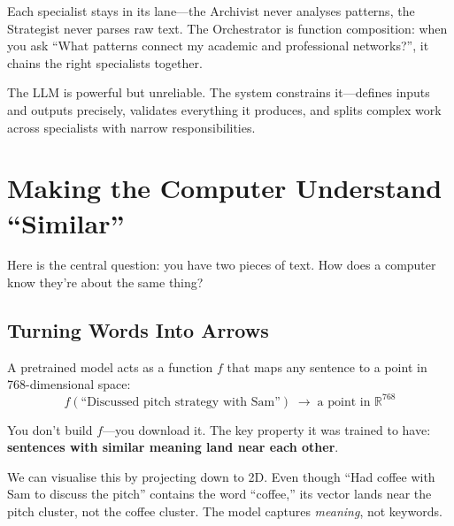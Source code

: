 \documentclass[11pt, letterpaper]{article}
\begin{document}
Each specialist stays in its lane---the Archivist never analyses patterns, the Strategist never parses raw text. The Orchestrator is function composition: when you ask ``What patterns connect my academic and professional networks?'', it chains the right specialists together.

\begin{keyidea}
The LLM is powerful but unreliable. The system constrains it---defines inputs and outputs precisely, validates everything it produces, and splits complex work across specialists with narrow responsibilities.
\end{keyidea}

\section{Making the Computer Understand ``Similar''}
\label{sec:vectors}

Here is the central question: you have two pieces of text. How does a computer know they're about the same thing?

\subsection{Turning Words Into Arrows}

A pretrained model acts as a function $f$ that maps any sentence to a point in 768-dimensional space:
\[
    f(\text{``Discussed pitch strategy with Sam''}) \;\longrightarrow\; \text{a point in } \mathbb{R}^{768}
\]

You don't build $f$---you download it. The key property it was trained to have: \textbf{sentences with similar meaning land near each other}.

We can visualise this by projecting down to 2D. Even though ``Had coffee with Sam to discuss the pitch'' contains the word ``coffee,'' its vector lands near the pitch cluster, not the coffee cluster. The model captures \emph{meaning}, not keywords.
\end{document}
